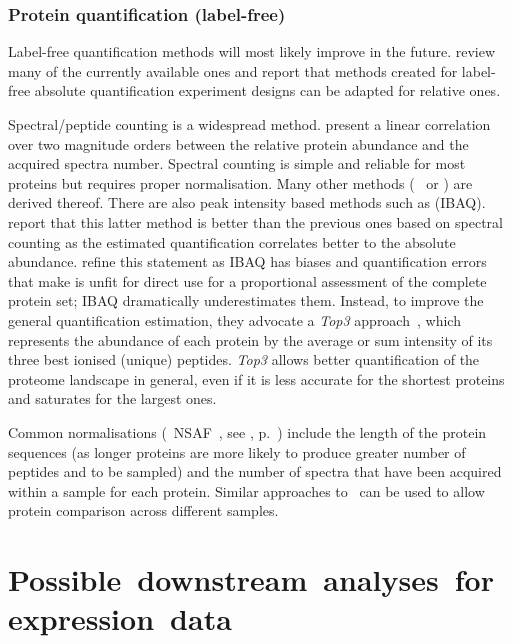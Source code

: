 \subsubsection{Protein quantification (label-free)}\label{subsubsec:protQuantLB}

Label-free quantification methods will most likely improve in the future.
\citet{Nikolov2012-hq} review many of the currently available ones and report that
methods created for label-free absolute quantification experiment designs
can be adapted for relative ones.

Spectral/peptide counting is a widespread method.
\citet{Liu2004-cj} present a linear correlation over two magnitude orders
between the relative protein abundance and the acquired spectra number.
Spectral counting is simple and reliable for most proteins
but requires proper normalisation.
Many other methods (\eg\  or )
are derived thereof.
There are also peak intensity based methods such as  (\gls{IBAQ}).
\citet{Arike2012} report that this latter method is better than the previous ones
based on spectral counting as the estimated quantification correlates better to
the absolute abundance.
\citet{TOP3isbetter} refine this statement
as \gls{IBAQ} has biases and quantification errors
that make is unfit for direct
use for a proportional assessment of the complete protein set;
\gls{IBAQ} dramatically underestimates them.
Instead, to improve the general quantification estimation,
they advocate a \emph{Top3} approach~,
which represents the abundance of each protein by the average or sum intensity of
its three best ionised (unique) peptides.
\emph{Top3} allows better quantification of the proteome landscape in general,
even if it is less accurate for the shortest proteins and
saturates for the largest ones.

Common normalisations
(\eg\ \gls{NSAF}~, see , p.~\pageref{eq:NSAF})
include the length of the protein sequences
(as longer proteins are more likely to produce greater number of peptides and
to be sampled) and the number of spectra that have been acquired within a sample
for each protein.
Similar approaches to \Rnaseq\ can be used to allow protein comparison
across different samples.


\section{Possible~downstream~analyses~for~expression~data}\label{sec:enrichmentAnalysis}

